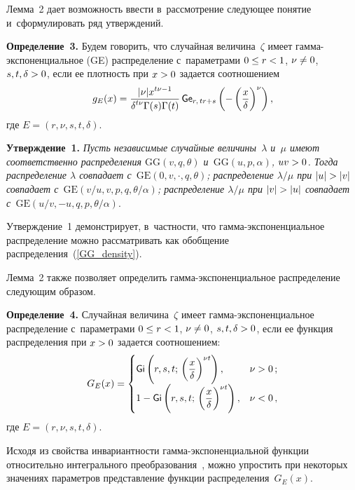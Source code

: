 \begin{multicols}{2}
Лемма~2 дает возможность ввести в~рас\-смот\-ре\-ние следующее 
понятие и~сформулировать ряд утверждений.

\smallskip

\noindent
\textbf{Определение~3.}
Будем говорить, что случайная величина~$\zeta$ имеет гам\-ма-экс\-по\-нен\-ци\-аль\-ное (GE) 
распределение с~параметрами $0\hm\le r\hm<1$, $\nu\hm\neq0$, $s,t,\delta\hm>0$, если ее 
плотность при $x\hm>0$ задается соотношением
$$
g_E(x) =
\displaystyle\frac{\displaystyle |\nu|x^{t\nu-1}\mathstrut}{\displaystyle \delta^{t\nu}\Gamma(s)\Gamma(t)\mathstrut}
\,   {\sf Ge}_{r,\, tr+s}\left(-\left( \displaystyle\frac{\displaystyle x\mathstrut}{\displaystyle \delta\mathstrut} \right)^{\nu}\right),
$$
где $E=(r,\nu,s,t,\delta)$.

\smallskip

\noindent
\textbf{Утверждение~1.}
\textit{Пусть независимые случайные величины~$\lambda$ и~$\mu$ имеют соответственно 
распределения $\mathrm{GG}(v,q,\theta)$ и~$\mathrm{GG}(u,p,\alpha)$, $uv\hm>0$. Тогда
распределение $\lambda$ совпадает с~$\mathrm{GE}(0,v,\cdot,q,\theta)$;
распределение $\lambda/\mu$ при $|u|\hm>|v|$ совпадает 
с~$\mathrm{GE}(v/u,v,p,q,\theta/\alpha)$;
распределение $\lambda/\mu$ при $|v|\hm>|u|$ совпадает с~$\mathrm{GE}(u/v,-
u,q,p,\theta/\alpha)$}.


\smallskip

Утверждение~1 демонстрирует, в~частности, что гам\-ма-экс\-по\-нен\-ци\-аль\-ное 
распределение можно рассматривать как обобщение распределения~(\ref{GG_density}).

Лемма~2 также позволяет определить гам\-ма-экс\-по\-нен\-ци\-аль\-ное 
распределение следующим образом.

\smallskip

\noindent
\textbf{Определение~4.}
Случайная величина~$\zeta$ имеет гам\-ма-экс\-по\-нен\-ци\-аль\-ное распределение 
с~параметрами $0\hm\le r\hm<1$, $\nu\hm\neq0$, $s,t,\delta\hm>0$, если ее функция 
распределения при $x\hm>0$ задается соотношением:
$$
G_E(x) =
 \begin{cases}
   \displaystyle {\sf Gi}\left(r,s,t;\,\left(\displaystyle\frac{\displaystyle x\mathstrut}{\displaystyle \delta\mathstrut}\right)^{\nu t}\right), & \nu>0\,;\\[3pt]
   \displaystyle 1-{\sf Gi}\left(r,s,t;\,\left(\displaystyle\frac{\displaystyle x\mathstrut}{\displaystyle \delta\mathstrut}\right)^{\nu t}\right), & \nu<0\,,
 \end{cases}
$$
где $E=(r,\nu,s,t,\delta)$.


\smallskip

Исходя из свойства инвариантности гамма-экс\-по\-нен\-ци\-аль\-ной функции относительно 
интегрального преобразования~\cite{Ku2019_1}, можно упростить при некоторых 
значениях параметров представление функции распределения~$G_E(x)$.


\end{multicols}
